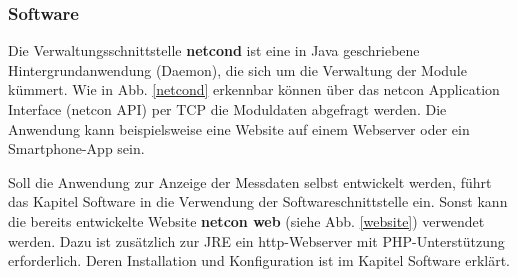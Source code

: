 \documentclass[a4paper,14pt,headsepline]{scrartcl}
\begin{document}
\newpage

\subsubsection{Software}
Die Verwaltungsschnittstelle \textbf{netcond} ist eine in Java geschriebene Hintergrundanwendung (Daemon), die sich um die Verwaltung der Module kümmert. Wie in Abb. \ref{netcond} erkennbar können über das netcon Application Interface (netcon API) per TCP die Moduldaten abgefragt werden. Die Anwendung kann beispielsweise eine Website auf einem Webserver oder ein Smartphone-App sein. 

\begin{figure}[h]
\begin{center}
\end{center}
\end{figure}

\newpage
Soll die Anwendung zur Anzeige der Messdaten selbst entwickelt werden, führt das Kapitel Software in die Verwendung der Softwareschnittstelle ein. Sonst kann die bereits entwickelte Website \textbf{netcon web} (siehe Abb. \ref{website}) verwendet werden. Dazu ist zusätzlich zur JRE ein http-Webserver mit PHP-Unterstützung erforderlich. Deren Installation und Konfiguration ist im Kapitel Software erklärt. 
\end{document}
